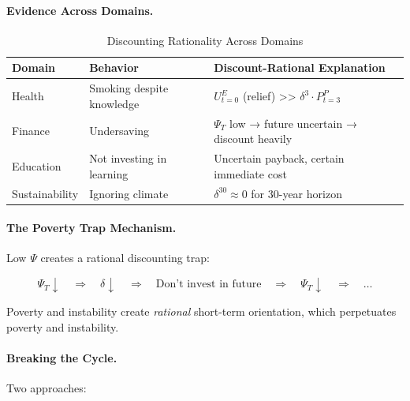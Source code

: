 \paragraph{Evidence Across Domains.}

\begin{table}[htbp]
\centering
\caption{Discounting Rationality Across Domains}
\label{tab:discounting-evidence}
\renewcommand{\arraystretch}{1.3}
\begin{tabular}{@{}llp{5cm}@{}}
\toprule
\textbf{Domain} & \textbf{Behavior} & \textbf{Discount-Rational Explanation} \\
\midrule
Health & Smoking despite knowledge & $U^E_{t=0}$ (relief) >> $\delta^3 \cdot P^P_{t=3}$ \\
Finance & Undersaving & $\Psi_T$ low → future uncertain → discount heavily \\
Education & Not investing in learning & Uncertain payback, certain immediate cost \\
Sustainability & Ignoring climate & $\delta^{30} \approx 0$ for 30-year horizon \\
\bottomrule
\end{tabular}
\end{table}

\paragraph{The Poverty Trap Mechanism.}
Low $\Psi$ creates a rational discounting trap:

\begin{equation}
\Psi_T \downarrow \quad \Rightarrow \quad \delta \downarrow \quad \Rightarrow \quad \text{Don't invest in future} \quad \Rightarrow \quad \Psi_T \downarrow \quad \Rightarrow \quad \ldots
\end{equation}

Poverty and instability create \emph{rational} short-term orientation,
which perpetuates poverty and instability.

\paragraph{Breaking the Cycle.}
Two approaches:

